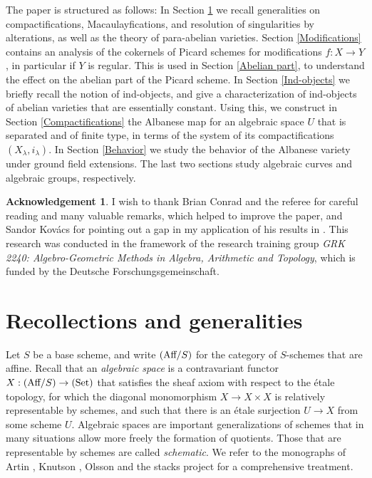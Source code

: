 \documentclass[oneside, 12pt]{amsart}
\newcommand\mylabel[1]{\label{#1}\marginpar{\vspace{-1ex}\medskip\medskip\footnotesize \tt #1}}
\renewcommand\mylabel[1]{\label{#1}}
\theoremstyle{definition}
\newtheorem*{acknowledgement}{Acknowledgement}
\theoremstyle{remark}
\newcommand{\Aff}{\text{\rm Aff}}
\newcommand{\ra}{\rightarrow}
\newcommand{\Set}{{\text{\rm Set}}}
\begin{document}
\medskip
The paper is structured as follows:
In Section \ref{Generalities} we recall  generalities on compactifications, Macaulayfications, and resolution of singularities by alterations,
as well as the theory of para-abelian varieties.
Section \ref{Modifications} contains an analysis of the cokernels of Picard schemes for modifications $f:X\ra Y$,
in particular if $Y$ is regular.
This is used in Section \ref{Abelian part}, to understand the effect on the  abelian part of the Picard scheme.
In Section \ref{Ind-objects} we briefly recall the notion of ind-objects, and give a characterization of
ind-objects of abelian varieties that are essentially constant. Using this, we construct in Section \ref{Compactifications}
the Albanese map for an algebraic space $U$ that is separated and of finite type, in terms of
the system of its compactifications $(X_\lambda,i_\lambda)$.
In Section \ref{Behavior} we study the behavior of the Albanese variety under ground field extensions.
The last two sections study algebraic curves and algebraic groups, respectively. 

\begin{acknowledgement}
I wish to thank Brian Conrad and the referee for careful reading and  many valuable remarks, which helped to improve the paper,
and Sandor Kov\'acs for pointing out
a gap in my application of his results in \cite{Kovacs 2017}.
This research was conducted in the framework of the   research training group
\emph{GRK 2240: Algebro-Geometric Methods in Algebra, Arithmetic and Topology}, which is funded
by the Deutsche Forschungsgemeinschaft. 
\end{acknowledgement}


\section{Recollections and generalities}
\mylabel{Generalities}

Let $S$ be a base scheme, and write $(\Aff/S)$ for the category of   $S$-schemes that are affine.
Recall that an \emph{algebraic space} is a contravariant functor $X:(\Aff/S)\ra(\Set)$
that satisfies the sheaf axiom with respect to the \'etale topology, for which 
the diagonal monomorphism $X\ra X\times X$ is relatively representable by schemes,
and such that there is an \'etale surjection $U\ra X$ from some scheme $U$.
Algebraic spaces are important generalizations of schemes that in many situations allow more freely
the formation of quotients. Those that are representable by schemes are called \emph{schematic}.
We refer to the monographs of Artin \cite{Artin 1973}, Knutson \cite{Knutson 1971},   
Olsson \cite{Olsson 2016} and the stacks project \cite{SP} for a comprehensive treatment.
\end{document}
